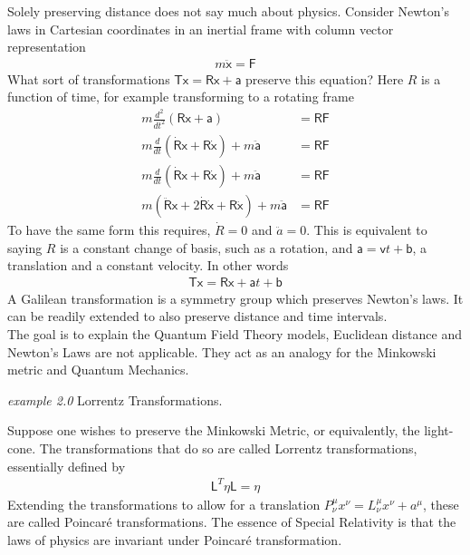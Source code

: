 Solely preserving distance does not say much about physics. Consider Newton's laws in Cartesian coordinates in an inertial frame with column vector representation
\begin{align*}
m \ddot{\mathsf{x}} = \mathsf{F}
\end{align*}
What sort of transformations $\mathsf{Tx}=\mathsf{Rx}+\mathsf{a}$ preserve this equation? Here $R$ is a function of time, for example transforming to a rotating frame
\begin{align*} 
m \frac{d^2}{dt^2}(\mathsf{Rx+a}) &= \mathsf{RF} 
\\
m \frac{d}{dt}(\dot{\mathsf{R}} \mathsf{x} + \mathsf{R} \dot{\mathsf{x}} )+m\ddot{\mathsf{a}} &= \mathsf{RF} \\
m \frac{d}{dt}(\dot{\mathsf{R}} \mathsf{x} + \mathsf{R} \dot{\mathsf{x}} )+m\ddot{\mathsf{a}}&= \mathsf{RF} \\
m (\ddot{\mathsf{R}} \mathsf{x} + 2\dot{\mathsf{R}} \dot{\mathsf{x}}+\mathsf{R} \ddot{\mathsf{x}} )+m\ddot{\mathsf{a}} &= \mathsf{RF} 
\end{align*}
To have the same form this requires, $\dot{R}=0$ and $\ddot{a}=0$. This is equivalent to saying $R$ is a constant change of basis, such as a rotation, and $\mathsf{a} = \mathsf{v}t + \mathsf{b}$, a translation and a constant velocity. In other words
\begin{align*}
\mathsf{Tx} =  \mathsf{Rx} + \mathsf{a}t+\mathsf{b}
\end{align*}
A Galilean transformation is a symmetry group which preserves Newton's laws. It can be readily extended to also preserve distance and time intervals. \\

The goal is to explain the Quantum Field Theory models, Euclidean distance and Newton's Laws are not applicable. They act as an analogy for the Minkowski metric and Quantum Mechanics.

\begin{flushleft}\textit{example 2.0} Lorrentz Transformations. \end{flushleft}
Suppose one wishes to preserve the Minkowski Metric, or equivalently, the light-cone. The transformations that do so are called Lorrentz transformations, essentially defined by
\begin{align*}
\mathsf{L}^T \mathsf{\eta} \mathsf{L} = \mathsf{\eta}
\end{align*}
Extending the transformations to allow for a translation $P^\mu_\nu x^\nu = L^\mu_\nu x^\nu + a^\mu$, these are called Poincaré transformations. The essence of Special Relativity is that the laws of physics are invariant under Poincaré transformation.

